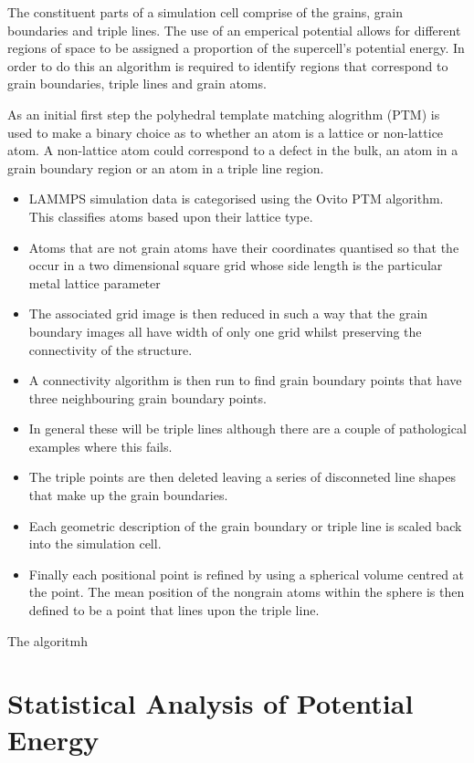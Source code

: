 \documentclass[12pt,a4paper]{book}
\begin{document}
The constituent parts of a simulation cell comprise of the grains, grain boundaries and triple lines. The use of an emperical potential allows for different regions of space to be assigned a proportion of the supercell's potential energy. In order to do this an algorithm is required to identify regions that correspond to grain boundaries, triple lines and grain atoms.

As an initial first step the polyhedral template matching alogrithm (PTM) is used to make a binary choice as to whether an atom is a lattice or non-lattice atom. A non-lattice atom could correspond to a defect in the bulk, an atom in a grain boundary region  or an atom in a triple line region.

\begin{itemize}

	\item LAMMPS simulation data is categorised using the Ovito PTM algorithm. This classifies atoms based upon their lattice type.
	\item Atoms that are not grain  atoms have their coordinates quantised so that the occur in a two dimensional square grid whose side length is the particular metal lattice parameter
	\item The associated grid image is then reduced in such a way that the grain boundary images all have width of only one grid whilst preserving the connectivity of the structure.
	\item A connectivity algorithm is then run to find grain boundary points that have three neighbouring grain boundary points.
	\item In general these will be triple lines although there are a couple of pathological examples where this fails.
	\item The triple points are then deleted leaving a series of disconneted line shapes that make up the grain boundaries.
	\item Each geometric description of the grain boundary or triple line is scaled back into the simulation cell. 
	\item Finally each positional point is refined by using a spherical volume centred at the point. The mean position of the nongrain atoms within the sphere is then defined to be a point that lines upon the triple line. 

\end{itemize} 

The algoritmh 

\section{Statistical Analysis of Potential Energy}
\end{document}
